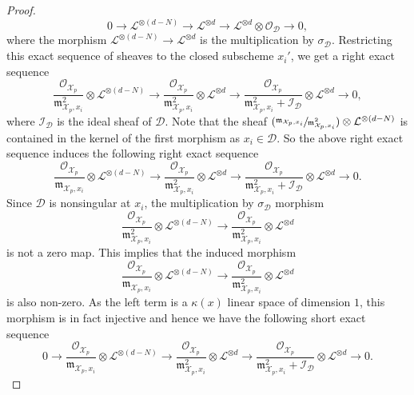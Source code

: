 \documentclass[11pt]{article}
\numberwithin{equation}{section}
\newcommand{\Psfrac}[2]{(\sfrac{#1}{#2})}
\theoremstyle{plain}
\theoremstyle{definition}
\newcommand{\X}{\mathcal{X}}
\newcommand{\li}{\mathcal{L}}
\begin{document}
\begin{proof}
\[
0\to \li^{\otimes (d-N)} \to \li^{\otimes d} \to \li^{\otimes d}\otimes \mathcal{O}_{\mathcal{D}}\to 0,
\]
where the morphism $\li^{\otimes (d-N)} \to \li^{\otimes d}$ is the multiplication by $\sigma_{\mathcal{D}}$. Restricting this exact sequence of sheaves to the closed subscheme $x_i'$, we get a right exact sequence\vspace*{-3pt}
\[
\frac{\mathcal{O}_{\X_p}}{\mathfrak{m}_{\X_p, x_i}^2}\otimes \li^{\otimes (d-N)} \to \frac{\mathcal{O}_{\X_p}}{\mathfrak{m}_{\X_p, x_i}^2}\otimes \li^{\otimes d}\to \frac{\mathcal{O}_{\X_p}}{\mathfrak{m}^2_{\X_p, x_i}+\mathcal{I}_{\mathcal{D}}}\otimes \li^{\otimes d}\to 0,
\]
where $\mathcal{I}_{\mathcal{D}}$ is the ideal sheaf of $\mathcal{D}$. Note that the sheaf $\Psfrac{\mathfrak{m}_{\X_p, x_i}}{\mathfrak{m}_{\X_p, x_i}^2}\otimes \li^{\otimes (d-N)}$ is contained in the kernel of the first morphism as $x_i\in \mathcal{D}$. So the above right exact sequence induces the following right exact sequence\vspace*{-3pt}
\[
\frac{\mathcal{O}_{\X_p}}{\mathfrak{m}_{\X_p, x_i}}\otimes \li^{\otimes (d-N)} \to \frac{\mathcal{O}_{\X_p}}{\mathfrak{m}_{\X_p, x_i}^2}\otimes \li^{\otimes d}\to \frac{\mathcal{O}_{\X_p}}{\mathfrak{m}^2_{\X_p, x_i}+\mathcal{I}_{\mathcal{D}}}\otimes \li^{\otimes d}\to 0.
\]
Since $\mathcal{D}$ is nonsingular at $x_i$, the multiplication by $\sigma_{\mathcal{D}}$ morphism\vspace*{-3pt}
\[
\frac{\mathcal{O}_{\X_p}}{\mathfrak{m}_{\X_p, x_i}^2}\otimes \li^{\otimes (d-N)} \to \frac{\mathcal{O}_{\X_p}}{\mathfrak{m}_{\X_p, x_i}^2}\otimes \li^{\otimes d}
\]
is not a zero map. This implies that the induced morphism\vspace*{-3pt}
\[
\frac{\mathcal{O}_{\X_p}}{\mathfrak{m}_{\X_p, x_i}}\otimes \li^{\otimes (d-N)} \to \frac{\mathcal{O}_{\X_p}}{\mathfrak{m}_{\X_p, x_i}^2}\otimes \li^{\otimes d}
\]
is also non-zero.
As the left term is a $\kappa(x)$ linear space of dimension $1$, this morphism is in fact injective and hence we have the following short exact sequence\vspace*{-3pt}
\[
0\to \frac{\mathcal{O}_{\X_p}}{\mathfrak{m}_{\X_p, x_i}}\otimes \li^{\otimes (d-N)} \to \frac{\mathcal{O}_{\X_p}}{\mathfrak{m}_{\X_p, x_i}^2}\otimes \li^{\otimes d}\to \frac{\mathcal{O}_{\X_p}}{\mathfrak{m}^2_{\X_p, x_i}+\mathcal{I}_{\mathcal{D}}}\otimes \li^{\otimes d}\to 0.
\]


\end{proof}
\end{document}
